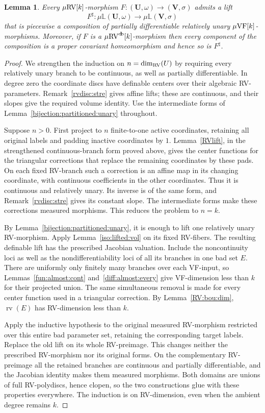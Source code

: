 \documentclass[12pt]{amsart}
\theoremstyle{plain}
\newtheorem{lem}[thm]{Lemma}
\theoremstyle{definition}
\theoremstyle{remark}
\numberwithin{equation}{section}
\theoremstyle{plain}
\newcommand{\VF}{\textup{VF}}
\newcommand{\RV}{\textup{RV}}
\newcommand{\0}{\emptyset}
\newcommand{\bb}[1]{\mathbb{#1}}
\newcommand{\fun}{\longrightarrow}
\newcommand{\mVF}{{\mu}{\VF}}
\newcommand{\mRV}{{\mu}{\RV}}
\DeclareMathOperator{\rv}{rv}
\DeclareMathOperator{\db}{d \! b}
\begin{document}
\begin{lem}\label{L:measure:class:lift}
Every $\mRV[k]$-morphism $F : (\bm U, \omega) \fun (\bm V, \sigma)$ admits a lift
\[
F^\sharp: {\mu}\bb{L}(\bm U, \omega) \fun {\mu}\bb{L}(\bm V, \sigma)
\]
that is piecewise a composition of partially differentiable relatively unary $\mVF[k]$-morphisms. Moreover, if $F$ is a $\mRV^{\db}[k]$-morphism then every component of the composition is a  proper covariant homeomorphism and hence so is $F^\sharp$.
\end{lem}
\begin{proof}
We strengthen the induction on $n=\dim_{\RV}(U)$ by requiring every relatively unary branch to be continuous, as well as partially differentiable. In degree zero the coordinate discs have definable centers over their algebraic RV-parameters. Remark~\ref{rvdisc:stre} gives affine lifts; these are continuous, and their slopes give the required volume identity. Use the intermediate forms of Lemma~\ref{bijection:partitioned:unary} throughout.

Suppose $n>0$. First project to $n$ finite-to-one active coordinates, retaining all original labels and padding inactive coordinates by $1$. Lemma~\ref{RVlift}, in the strengthened continuous-branch form proved above, gives the center functions for the triangular corrections that replace the remaining coordinates by these pads. On each fixed RV-branch such a correction is an affine map in its changing coordinate, with continuous coefficients in the other coordinates. Thus it is continuous and relatively unary. Its inverse is of the same form, and Remark~\ref{rvdisc:stre} gives its constant slope. The intermediate forms make these corrections measured morphisms. This reduces the problem to $n=k$.

By Lemma~\ref{bijection:partitioned:unary}, it is enough to lift one relatively unary RV-morphism. Apply Lemma~\ref{iso:lifted:vol} on its fixed RV-fibers. The resulting definable lift has the prescribed Jacobian valuation. Include the noncontinuity loci as well as the nondifferentiability loci of all its branches in one bad set $E$. There are uniformly only finitely many branches over each VF-input, so Lemmas~\ref{fun:almost:cont} and~\ref{diff:almost:every} give VF-dimension less than $k$ for their projected union. The same simultaneous removal is made for every center function used in a triangular correction. By Lemma~\ref{RV:bou:dim}, $\rv(E)$ has RV-dimension less than $k$.

Apply the inductive hypothesis to the original measured RV-morphism restricted over this entire bad parameter set, retaining the corresponding target labels. Replace the old lift on its whole RV-preimage. This changes neither the prescribed RV-morphism nor its original forms. On the complementary RV-preimage all the retained branches are continuous and partially differentiable, and the Jacobian identity makes them measured morphisms. Both domains are unions of full RV-polydiscs, hence clopen, so the two constructions glue with these properties everywhere. The induction is on RV-dimension, even when the ambient degree remains $k$.


\end{proof}
\end{document}
